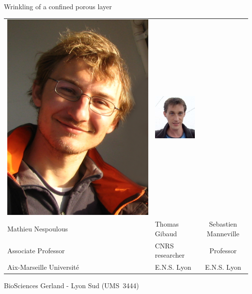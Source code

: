 \documentclass[xcolor=table]{beamer}
\begin{document}
\begin{frame}{Wrinkling of a confined porous layer}
\begin{tabu}{X[c]X[c]c}
\includegraphics[height=0.3\textheight]{Thomas}&
\includegraphics[height=0.3\textheight]{Seb}\\
Mathieu Nespoulous & Thomas Gibaud & Sebastien Manneville\\
Associate Professor & CNRS researcher & Professor\\
Aix-Marseille Université & E.N.S. Lyon & E.N.S. Lyon\\
\end{tabu}

\bigskip
{} BioSciences Gerland - Lyon Sud (UMS~3444)
\end{frame}
\end{document}
